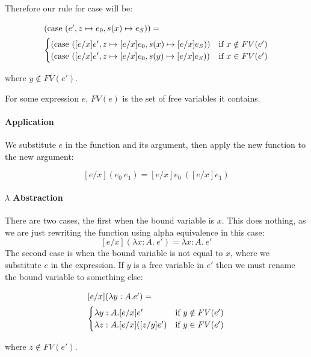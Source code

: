 Therefore our rule for case will be:

\begin{minipage}{4in}
\begin{align*}
\intertext{$(\operatorname{case} \ (e', z \mapsto e_0, s(x) \mapsto e_S))=$}
  \begin{cases}
            (\operatorname{case} \ ([e/x]e', z \mapsto [e/x]e_0, s(x) \mapsto [e/x]e_S)) & \text{if } x \notin FV(e')  \\
            (\operatorname{case} \ ([e/x]e', z \mapsto [e/x]e_0, s(y) \mapsto [e/x]e_S)) & \text{if } x \in FV(e')
  \end{cases}
\end{align*} 
\end{minipage}

where $y \notin FV(e')$. 

For some expression $e$, $FV(e)$ is the set of free variables it contains.

\paragraph{Application} We substitute $e$ in the function and its argument, then apply the new function to the new argument:

\[ [e/x] (e_0 \ e_1) = [e/x]e_0 \ ([e/x]e_1) \]

\paragraph{$\lambda$ Abstraction} There are two cases, the first when the bound variable is $x$. This does nothing, as we are just rewriting the function using alpha equivalence in this case:
\[ [e/x](\lambda x:A. \ e') = \lambda x:A. \ e' \]
The second case is when the bound variable is not equal to $x$, where we substitute $e$ in the expression. If $y$ is a free variable in $e'$ then we must rename the bound variable to something else:

\begin{minipage}{4in}
\begin{align*}
\intertext{$[e/x](\lambda y:A.e')=$}
  \begin{cases}
            \lambda y:A. [e/x]e' & \text{if } y \notin FV(e')  \\
           \lambda z:A. [e/x]([z/y]e') & \text{if } y \in FV(e')
  \end{cases}
\end{align*} 
\end{minipage}

where $z \notin FV(e')$.

